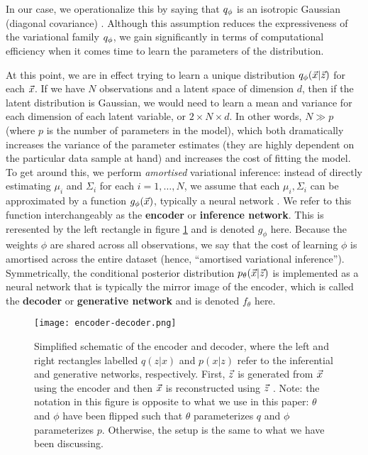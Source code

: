 In our case, we operationalize this by saying that $q_\phi$ is an isotropic Gaussian (diagonal covariance) \cite{blei2011}. Although this assumption reduces the expressiveness of the variational family $q_\phi$, we gain significantly in terms of computational efficiency when it comes time to learn the parameters of the distribution.

At this point, we are in effect trying to learn a unique distribution $q_\phi(\vec{x}|\vec{z})$ for each $\vec{x}$. If we have $N$ observations and a latent space of dimension $d$, then if the latent distribution is Gaussian, we would need to learn a mean and variance for each dimension of each latent variable, or $2\times N \times d$. In other words, $N\gg p$ (where $p$ is the number of parameters in the model), which both dramatically increases the variance of the parameter estimates (they are highly dependent on the particular data sample at hand) and increases the cost of fitting the model. To get around this, we perform {\it amortised} variational inference: instead of directly estimating $\mu_i$ and $\Sigma_i$ for each $i = 1, \dots, N$, we assume that each $\mu_i, \Sigma_i$ can be approximated by a function $g_\phi(\vec{x})$, typically a neural network \cite{jaanTutorial}. We refer to this function interchangeably as the {\bf encoder} or {\bf inference network}. This is reresented by the left rectangle in figure \ref{fig:encoder-decoder} and is denoted $g_\phi$ here. Because the weights $\phi$ are shared across all observations, we say that the cost of learning $\phi$ is amortised across the entire dataset (hence, ``amortised variational inference''). Symmetrically, the conditional posterior distribution $p_\theta(\vec{x}|\vec{z})$ is implemented as a neural network that is typically the mirror image of the encoder, which is called the {\bf decoder} or {\bf generative network} and is denoted $f_\theta$ here.

\begin{figure}[h]
    \texttt{[image: encoder-decoder.png]}
    \caption{Simplified schematic of the encoder and decoder, where the left and right rectangles labelled $q(z|x)$ and $p(x|z)$ refer to the inferential and generative networks, respectively. First, $\vec{z}$ is generated from $\vec{x}$ using the encoder and then $\vec{x}$ is reconstructed using $\vec{z}$ \cite{jaanTutorial}. Note: the notation in this figure is opposite to what we use in this paper: $\theta$ and $\phi$ have been flipped such that $\theta$ parameterizes $q$ and $\phi$ parameterizes $p$. Otherwise, the setup is the same to what we have been discussing.}
    \label{fig:encoder-decoder}
\end{figure}

